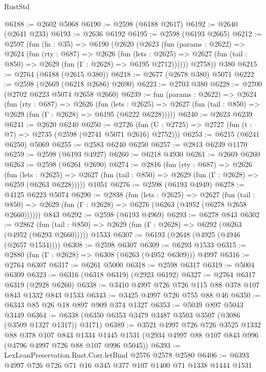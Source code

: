 \begin{lexlean}{RustStd}
\begin{coremodule}
@6188 := @2602 @5068
@6190 := @2598 (@6188 @2617)
@6192 := @2640 (@2641 @233)
@6193 := @2636 @6192
@6195 := @2598 (@6193 @2665)
@6212 := @2597
    (fun (fn : @35) =>
    @6190
      (@2620
        (@2623
          (fun (params : @2622) =>
          @2624
            (fun (rty : @687) =>
            @2626
              (fun (lets : @2625) =>
              @2627 (fun (tail : @850) => @2629 (fun (Γ : @2628) => @6195 @2712))))))
        @2758))
    @380
@6215 := @2764 (@6188 (@2615 @380))
@6218 := @2677 (@2678 @380) @5071
@6222 := @2598 (@2669 (@6218 @2686) @2690)
@6223 := @2703 @380
@6228 := @2700 (@2702 @6223 @5074 @2658 @2660)
@6239 := fun (params : @2622) =>
  @2624
    (fun (rty : @687) =>
    @2626
      (fun (lets : @2625) =>
      @2627 (fun (tail : @850) => @2629 (fun (Γ : @2628) => @6195 (@6222 @6228)))))
@6240 := @2623 @6239
@6241 := @2620 @6240
@6250 := @2726 (fun (U : @2725) => @2727 (fun (t : @7) => @2735 (@2598 (@2741 @5071 @2616) @2752)))
@6253 := @6215 (@6241 @6250) @5069
@6255 := @2583 @6240 @6250
@6257 := @2813 @6239 @1170
@6259 := @2598 (@6193 @4927)
@6260 := @6218 @4930
@6261 := @2669 @6260
@6263 := @2598 (@6261 @2690)
@6274 := @2816
    (fun (rty : @687) =>
    @2626
      (fun (lets : @2625) =>
      @2627 (fun (tail : @850) => @2629 (fun (Γ : @2628) => @6259 (@6263 @6228)))))
    @1051
@6276 := @2598 (@6193 @4949)
@6278 := @4125 @6223 @5074
@6290 := @2838
    (fun (lets : @2625) =>
    @2627
      (fun (tail : @850) => @2629 (fun (Γ : @2628) => @6276 (@6263 (@4952 (@6278 @2658 @2660))))))
    @843
@6292 := @2598 (@6193 @4969)
@6293 := @6278 @843
@6302 := @2862
    (fun (tail : @850) => @2629 (fun (Γ : @2628) => @6292 (@6263 (@4952 (@6293 @2660)))))
    @1533
@6307 := @6193 (@2648 (@4925 (@4946 (@2657 @1534))))
@6308 := @2598 @6307
@6309 := @6293 @1533
@6315 := @2880 (fun (Γ : @2628) => @6308 (@6263 (@4952 @6309))) @4997
@6316 := @2764 @6307
@6317 := @6261 @5000
@6318 := @2598 @6317
@6319 := @5004 @6309
@6323 := @6316 (@6318 @6319) (@2923 @6192)
@6327 := @2764 @6317 @6319 (@2928 @6260)
@6338 := @3410 @4997 @726 @726 @115 @88 @378 @107 @843 @1332 @843 @1533
@6343 := @3425 @4997 @726 @755 @88 @46
@6350 := @6343 @85 @26 @18 @897 @909 @374 @1327
@6353 := @5039 @897 @5043 @3449
@6364 := @6338 (@6350 @6353 @3479 @3487 @3503 @3507 (@3086 (@3509 @1327 @1317)) @3171)
@6389 := @3521
    @4997
    @726
    @726
    @3525
    @1332
    @88
    @378
    @107
    @843
    @1334
    @1445
    @1531
    (@2934 @4997 @88 @107 @843 @996 (@4796 @4997 @726 @88 @107 @996 @5045))
@6393 := LexLeanPreservation.Rust.Corr.letBind @2576 @2578 @2580
@6406 := @6393 @4997 @726 @726 @71 @16 @345 @377 @107 @1400 @71 @1338 @1444 @1531

\end{coremodule}
\end{lexlean}
